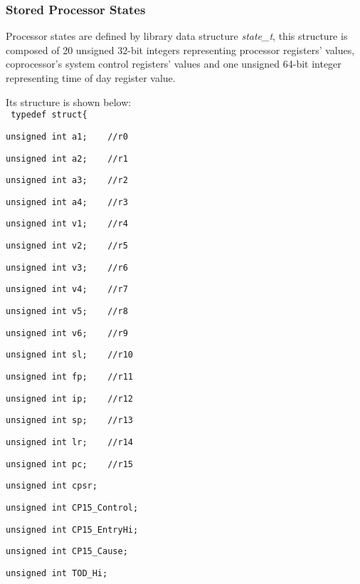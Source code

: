 \subsubsection{Stored Processor States}
Processor states are defined by library data structure \emph{state\_t}, this structure is composed of 20 unsigned 32-bit integers representing processor registers' values, coprocessor's system control registers' values and one unsigned 64-bit integer representing time of day register value.

Its structure is shown below:
\nopagebreak
\\
\texttt{ typedef struct\{}

\nopagebreak
\texttt{unsigned int a1;\ \ \ \ //r0}

\nopagebreak
\texttt{unsigned int a2;\ \ \ \ //r1}

\nopagebreak
\texttt{unsigned int a3;\ \ \ \ //r2}

\nopagebreak
\texttt{unsigned int a4;\ \ \ \ //r3}

\nopagebreak
\texttt{unsigned int v1;\ \ \ \ //r4}

\nopagebreak
\texttt{unsigned int v2;\ \ \ \ //r5}

\nopagebreak
\texttt{unsigned int v3;\ \ \ \ //r6}

\nopagebreak
\texttt{unsigned int v4;\ \ \ \ //r7}

\nopagebreak
\texttt{unsigned int v5;\ \ \ \ //r8}

\nopagebreak
\texttt{unsigned int v6;\ \ \ \ //r9}

\nopagebreak
\texttt{unsigned int sl;\ \ \ \ //r10}

\nopagebreak
\texttt{unsigned int fp;\ \ \ \ //r11}

\nopagebreak
\texttt{unsigned int ip;\ \ \ \ //r12}

\nopagebreak
\texttt{unsigned int sp;\ \ \ \ //r13}

\nopagebreak
\texttt{unsigned int lr;\ \ \ \ //r14}

\nopagebreak
\texttt{unsigned int pc;\ \ \ \ //r15}

\nopagebreak
\texttt{unsigned int cpsr;}

\nopagebreak
\texttt{unsigned int CP15\_Control;}

\nopagebreak
\texttt{unsigned int CP15\_EntryHi;}

\nopagebreak
\texttt{unsigned int CP15\_Cause;}

\nopagebreak
\texttt{unsigned int TOD\_Hi;}

